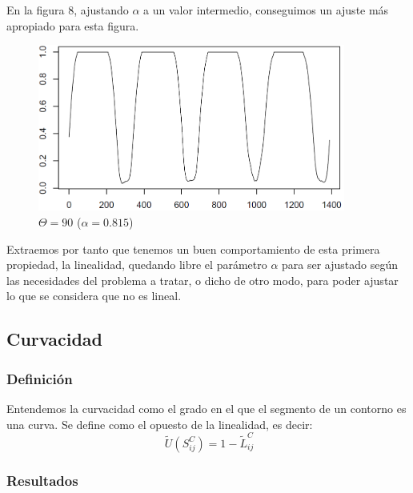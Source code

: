 En la figura 8, ajustando $\alpha$ a un valor intermedio, conseguimos un ajuste más apropiado para esta figura.\\

\begin{figure}[H]
\begin{center}

\includegraphics[width=0.9\textwidth]{img/lin-dev3-1-limpio-0815.png}
\end{center}

\caption{$\Theta = 90$ ($\alpha = 0.815$)}
\end{figure}

Extraemos por tanto que tenemos un buen comportamiento de esta primera propiedad, la linealidad, quedando libre el parámetro $\alpha$ para ser ajustado según las necesidades del problema a tratar, o dicho de otro modo, para poder ajustar lo que se considera que no es lineal.\\

\subsection{Curvacidad}


\subsubsection{Definición}

Entendemos la curvacidad como el grado en el que el segmento de un contorno es una curva. Se define como el opuesto de la linealidad, es decir:\\

\[
\ \tilde{U}(S^C_{ij}) = 1 - \tilde{L}^C_{ij}
\]
 
\subsubsection{Resultados}

